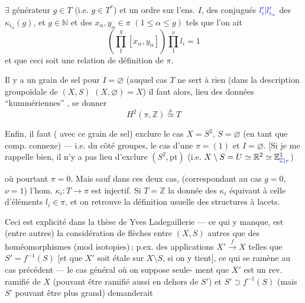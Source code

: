 
$\exists$ générateur $g\in T$ (i.e. $g\in T^*$) et un ordre 
sur l'ens. $I$,  des conjugués
$\textcolor{blue}{l_i'|l_{i_\alpha}'}$ des $\kappa_{i_\alpha}(g)$, et $g\in\mathbb N$ et des $x_\alpha,y_\alpha\in\pi$
$(1\leq\alpha\leq g)$ tels que l'on ait
\[
\left(\prod_1^g[x_\alpha,y_\alpha]\right)\prod_1^{\nu}l_i=1
\]
et que ceci soit une relation de définition
de $\pi$.

Il y a  un grain de sel pour $I=\varnothing$
(auquel cas $T$ ne sert à rien  (dans la
description groupoïdale de $(X,S)$ \unsure{$\simeq$|$=$} $(X,\varnothing)=X$)
il faut alors,  lieu des données
``kummériennes'' \inserted{$\kappa$}, se donner
\[
H^2(\pi,\mathbb Z)\overset{\kappa}{\simeq}T
\]

Enfin, il faut 
( avec ce grain de sel) exclure le cas $X=S^2$, $S=\varnothing$
(en tant que comp. connexe) --- i.e.
du côté groupes, le cas d'une 
$\pi=(1)$  et $I=\varnothing$.
[Si je me rappelle bien, il n'y a pas lieu
d'exclure $(S^2,\mathrm{pt})$ (i.e. $X\setminus S=U\simeq\mathbb R^2\simeq\mathbb E^1_{\textcolor{blue}{\mathbb C|e}}$)


où pourtant  $\pi=0$. Mais sauf dans ces
deux cas,  (correspondant
au cas $g=0$, $\nu=1$) l'hom. $\kappa_i:T\longrightarrow\pi$
est injectif. Si $T=\mathbb Z$ la donnée des $\kappa_i$
équivaut à celle d'éléments $l_i\in\pi$, et on
retrouve la définition usuelle des
structures à lacets.

Ceci est explicité dans la thèse de
Yves Ladegaillerie --- ce qui y manque, est
(entre autres) la considération de flèches
entre $(X,S)$ autres que des homéomorphismes
(mod isotopies)\,; p.ex. des applications 
 $X'\xrightarrow{f}X$ telles que $S'=f^{-1}(S)$
[et que $X'$ soit étale sur $X\setminus S$, si on y tient\unsure{!}],
ce qui se ramène au cas précédent
--- le cas  général où on suppose seule-
ment que $X'$ est un rev. ramifié
de $X$ (pouvant être ramifié aussi en
dehors de $S'$) et $S'\supset f^{-1}(S)$ (mais $S'$
pouvant être plus grand) demanderait

